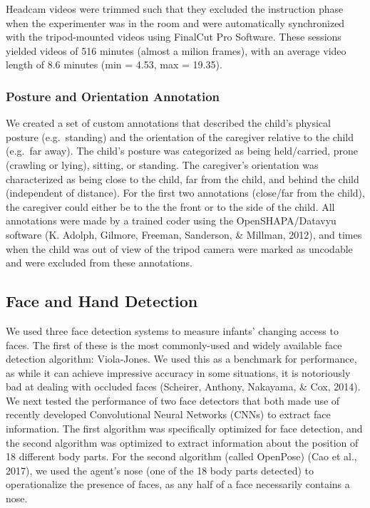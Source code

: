 \documentclass[10pt, letterpaper]{article}
\begin{document}
Headcam videos were trimmed such that they excluded the instruction
phase when the experimenter was in the room and were automatically
synchronized with the tripod-mounted videos using FinalCut Pro Software.
These sessions yielded videos of 516 minutes (almost a milion frames),
with an average video length of 8.6 minutes (min = 4.53, max = 19.35).

\subsubsection{Posture and Orientation
Annotation}\label{posture-and-orientation-annotation}

We created a set of custom annotations that described the child's
physical posture (e.g.~standing) and the orientation of the caregiver
relative to the child (e.g.~far away). The child's posture was
categorized as being held/carried, prone (crawling or lying), sitting,
or standing. The caregiver's orientation was characterized as being
close to the child, far from the child, and behind the child
(independent of distance). For the first two annotations (close/far from
the child), the caregiver could either be to the the front or to the
side of the child. All annotations were made by a trained coder using
the OpenSHAPA/Datavyu software (K. Adolph, Gilmore, Freeman, Sanderson,
\& Millman, 2012), and times when the child was out of view of the
tripod camera were marked as uncodable and were excluded from these
annotations.

\subsection{Face and Hand Detection}\label{face-and-hand-detection}

We used three face detection systems to measure infants' changing access
to faces. The first of these is the most commonly-used and widely
available face detection algorithm: Viola-Jones. We used this as a
benchmark for performance, as while it can achieve impressive accuracy
in some situations, it is notoriously bad at dealing with occluded faces
(Scheirer, Anthony, Nakayama, \& Cox, 2014). We next tested the
performance of two face detectors that both made use of recently
developed Convolutional Neural Networks (CNNs) to extract face
information. The first algorithm was specifically optimized for face
detection, and the second algorithm was optimized to extract information
about the position of 18 different body parts. For the second algorithm
(called OpenPose) (Cao et al., 2017), we used the agent's nose (one of
the 18 body parts detected) to operationalize the presence of faces, as
any half of a face necessarily contains a nose.
\end{document}
